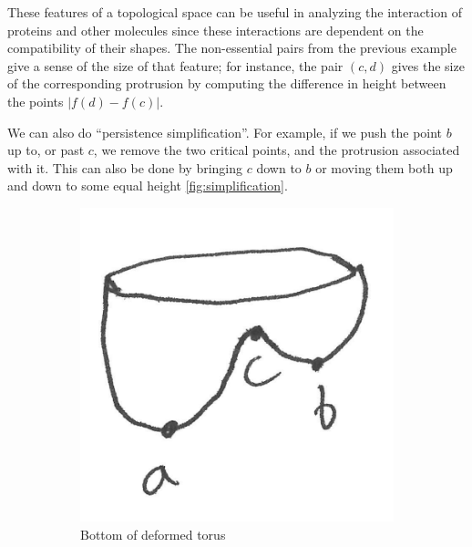 \documentclass{article}
\begin{document}
These features of a topological space can be useful in analyzing the interaction of proteins and other molecules since these interactions are dependent on the compatibility of their shapes. The non-essential pairs from the previous example give a sense of the size of that feature; for instance, the pair $(c,d)$ gives the size of the corresponding protrusion by computing the difference in height between the points $|f(d) - f(c)|$.

We can also do ``persistence simplification''. For example, if we push the point $b$ up to, or past $c$, we remove the two critical points, and the protrusion associated with it. This can also be done by bringing $c$ down
to $b$ or moving them both up and down to some equal height \cref{fig:simplification}.

\begin{figure}
	\centering
	\begin{subfigure}{0.24\columnwidth}
		\centering
		\includegraphics[width=\textwidth]{fig/blobby-torus-bottom}
		\caption{Bottom of deformed torus}
	\end{subfigure}
	\begin{subfigure}{0.24\columnwidth}
		\centering

\end{subfigure}
\end{figure}
\end{document}
